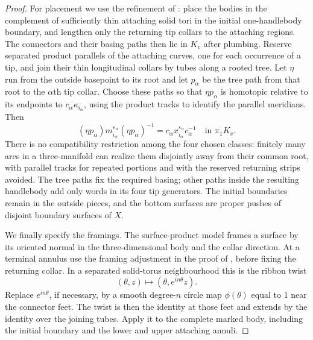 \begin{proof}
For placement we use the refinement of
\cite[Section~2.2, ``The exterior with its side marking'']{PD}:
place the bodies in the complement of sufficiently thin attaching
solid tori in the initial one-handlebody boundary, and lengthen only
the returning tip collars to the attaching regions.  The connectors
and their basing paths then lie in $K_v$ after plumbing.  Reserve
separated product parallels of the attaching curves, one for each
occurrence of a tip, and join their thin longitudinal collars by
tubes along a rooted tree.  Let $\eta$ run from the outside basepoint
to its root and let $p_\alpha$ be the tree path from that root to
the $\alpha$th tip collar.  Choose these paths so that
$\eta p_\alpha$ is homotopic relative to its endpoints to
$c_\alpha\kappa_{i_\alpha}$, using the product tracks to identify
the parallel meridians.  Then
\[
 (\eta p_\alpha)m_{i_\alpha}^{\varepsilon_\alpha}
       (\eta p_\alpha)^{-1}
   =c_\alpha x_{i_\alpha}^{\varepsilon_\alpha}c_\alpha^{-1}
   \quad\text{in }\pi_1K_v.
\]
There is no compatibility restriction among the four chosen classes:
finitely many arcs in a three-manifold can realize them disjointly
away from their common root, with parallel tracks for repeated
portions and with the reserved returning strips avoided.  The tree
paths fix the required basing; other paths inside the resulting
handlebody add only words in its four tip generators.  The initial
boundaries remain in the outside pieces, and the bottom surfaces
are proper pushes of disjoint boundary surfaces of $X$.

We finally specify the framings.  The surface-product model frames a
surface by its oriented normal in the three-dimensional body and the
collar direction.  At a terminal annulus use the framing adjustment
in the proof of \cite[Lemma~2.3]{MT}, before fixing the returning
collar.  In a separated solid-torus neighbourhood this is the ribbon
twist
\[
 (\theta,z)\longmapsto(\theta,e^{in\theta}z).
\]
Replace $e^{in\theta}$, if necessary, by a smooth degree-$n$ circle map
$\phi(\theta)$ equal to $1$ near the connector feet.  The twist is
then the identity at those feet and extends by the identity over
the joining tubes.  Apply it to the complete marked body, including
the initial boundary and the lower and upper attaching annuli.


\end{proof}
